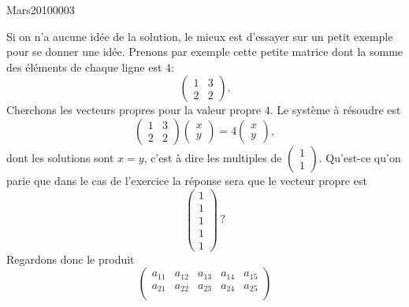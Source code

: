 

\begin{corrige}{Mars20100003}

	Si on n'a aucune idée de la solution, le mieux est d'essayer sur un petit exemple pour se donner une idée. Prenons par exemple cette petite matrice dont la somme des éléments de chaque ligne est $4$:
	\begin{equation}
		\begin{pmatrix}
			1	&	3	\\ 
			2	&	2	
		\end{pmatrix}.
	\end{equation}
	Cherchons les vecteurs propres pour la valeur propre $4$. Le système à résoudre est
	\begin{equation}
		\begin{pmatrix}
			1	&	3	\\ 
			2	&	2	
		\end{pmatrix}\begin{pmatrix}
			x	\\ 
			y	
		\end{pmatrix}=4\begin{pmatrix}
			x	\\ 
			y	
		\end{pmatrix},
	\end{equation}
	dont les solutions sont $x=y$, c'est à dire les multiples de $\begin{pmatrix}
		1	\\ 
		1	
	\end{pmatrix}$.
	Qu'est-ce qu'on parie que dans le cas de l'exercice la réponse sera que le vecteur propre est
	\begin{equation}
		\begin{pmatrix}
			1	\\ 
			1	\\ 
			1	\\ 
			1	\\ 
			1	
		\end{pmatrix}\, ?
	\end{equation}
	Regardons donc le produit
	\begin{equation}
		\begin{pmatrix}
			a_{11}	&	a_{12}	&	a_{13}	&	a_{14}	&	a_{15}\\	
			a_{21}	&	a_{22}	&	a_{23}	&	a_{24}	&	a_{25}\\	

\end{pmatrix}
\end{equation}
\end{corrige}

